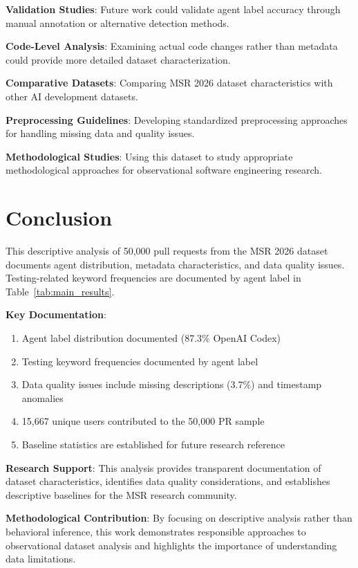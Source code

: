 \documentclass[conference]{IEEEtran}
\begin{document}
\textbf{Validation Studies}: Future work could validate agent label accuracy through manual annotation or alternative detection methods.

\textbf{Code-Level Analysis}: Examining actual code changes rather than metadata could provide more detailed dataset characterization.

\textbf{Comparative Datasets}: Comparing MSR 2026 dataset characteristics with other AI development datasets.

\textbf{Preprocessing Guidelines}: Developing standardized preprocessing approaches for handling missing data and quality issues.

\textbf{Methodological Studies}: Using this dataset to study appropriate methodological approaches for observational software engineering research.

\section{Conclusion}

This descriptive analysis of 50,000 pull requests from the MSR 2026 dataset documents agent distribution, metadata characteristics, and data quality issues. Testing-related keyword frequencies are documented by agent label in Table~\ref{tab:main_results}.

\textbf{Key Documentation}:
\begin{enumerate}
    \item Agent label distribution documented (87.3\% OpenAI Codex)
    \item Testing keyword frequencies documented by agent label
    \item Data quality issues include missing descriptions (3.7\%) and timestamp anomalies
    \item 15,667 unique users contributed to the 50,000 PR sample
    \item Baseline statistics are established for future research reference
\end{enumerate}

\textbf{Research Support}: This analysis provides transparent documentation of dataset characteristics, identifies data quality considerations, and establishes descriptive baselines for the MSR research community.

\textbf{Methodological Contribution}: By focusing on descriptive analysis rather than behavioral inference, this work demonstrates responsible approaches to observational dataset analysis and highlights the importance of understanding data limitations.
\end{document}
